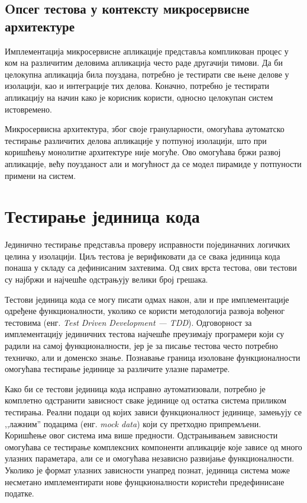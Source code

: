 \documentclass[12pt,oneside]{memoir}
\begin{document}
\subsection{Oпсег тестова у контексту микросервисне архитектуре}

Имплементација микросервисне апликације представља компликован процес у ком на различитим деловима апликација често раде другачији тимови. Да би целокупна апликација била поуздана, потребно је тестирати све њене делове у изолацији, као и интеграције тих делова. Коначно, потребно је тестирати апликацију на начин како је корисник користи, односно целокупан систем истовремено.

Микросервисна архитектура, због своје грануларности, омогућава аутоматско тестирање различитих делова апликације у потпуној изолацији, што при коришћењу монолитне архитектуре није могуће. Ово омогућава бржи развој апликације, већу поузданост али и могућност да се модел пирамиде у потпуности примени на систем. 

\section{Тестирање јединица кода}

Јединично тестирање представља проверу исправности појединачних логичких целина у изолацији. Циљ тестова је верификовати да се свака јединица кода понаша у складу са дефинисаним захтевима. Од свих врста тестова, ови тестови су најбржи и најчешће одстрањују велики број грешака. 

Тестови јединица кода се могу писати одмах након, али и пре имплементације одређене функционалности, уколико се користи методологија развоја вођеног тестовима (енг. \textit{Test Driven Development --- TDD}). Одговорност за имплементацију јединичних тестова најчешће преузимају програмери који су радили на самој функционалности, јер је за писање тестова често потребно техничко, али и доменско знање. Познавање граница изоловане функционалности омогућава тестирање  јединице за различите улазне параметре.

Како би се тестови јединица кода исправно аутоматизовали, потребно је комплетно одстранити зависност сваке јединице од остатка система приликом тестирања. Реални подаци од којих зависи функционалност јединице, замењују се ,,лажним” подацима (енг.\textit{ mock data}) који су претходно припремљени. Коришћење овог система има више предности. Одстрањивањем зависности омогућава се тестирање комплексних компоненти апликације које зависе од много улазних параметара, али се и омогућава независно развијање функционалности. Уколико је формат улазних зависности унапред познат, јединица система може несметано имплементирати нове фунцкионалности користећи предефинисане податке.
\end{document}

